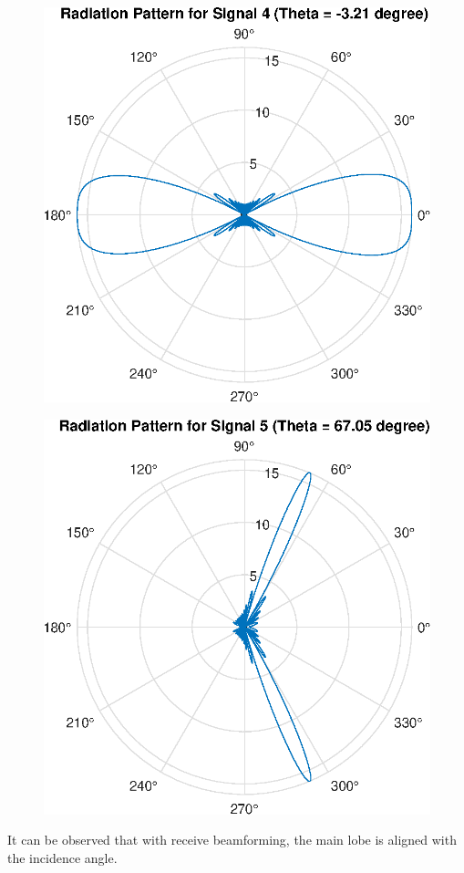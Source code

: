 \begin{figure}[H]
    \centering
    \includegraphics[scale = 0.7]{s4.eps}
\end{figure}
\begin{figure}[H]
    \centering
    \includegraphics[scale = 0.7]{s5.eps}
\end{figure}
It can be observed that with receive beamforming, the main lobe is aligned with the incidence angle.